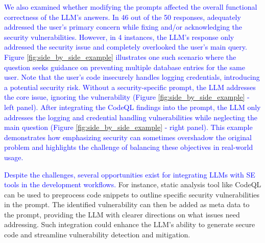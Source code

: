 \textcolor{blue}{We also examined whether modifying the prompts affected the overall functional correctness of the LLM's answers. In 46 out of the 50 responses, \gpt adequately addressed the user’s primary concern while fixing and/or acknowledging the security vulnerabilities. However, in 4 instances, the LLM’s response only addressed the security issue and completely overlooked the user’s main query. Figure \ref{fig:side_by_side_example} illustrates one such scenario where the question seeks guidance on preventing multiple database entries for the same user. Note that the user's code insecurely handles logging credentials, introducing a potential security risk. Without a security-specific prompt, the LLM addresses the core issue, ignoring the vulnerability (Figure \ref{fig:side_by_side_example} - left panel). After integrating the CodeQL findings into the prompt, the LLM only addresses the logging and credential handling vulnerabilities while neglecting the main question (Figure \ref{fig:side_by_side_example} - right panel). This example demonstrates how emphasizing security can sometimes overshadow the original problem and highlights the challenge of balancing these objectives in real-world usage.}

\textcolor{blue}{Despite the challenges, several opportunities exist for integrating LLMs with SE tools in the development workflows.} For instance, static analysis tool like CodeQL can be used to preprocess code snippets to outline specific security vulnerabilities in the prompt. The identified vulnerability can then be added as meta data to the prompt, providing the LLM with clearer directions on what issues need addressing. Such integration could enhance the LLM's ability to generate secure code and streamline vulnerability detection and mitigation.  

